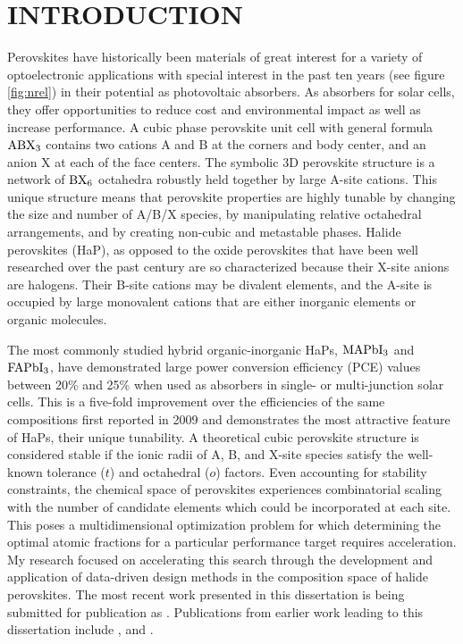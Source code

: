 \chapter{INTRODUCTION}
\label{sec:org2924b89}

Perovskites have historically been materials of great interest for a variety of optoelectronic applications with special interest in the past ten years (see figure \ref{fig:nrel}) in their potential as photovoltaic absorbers.
As absorbers for solar cells, they offer opportunities to reduce cost and environmental impact as well as increase performance.
\autocite{ansari-2018-front-oppor,yin-2015-halid-perov,manser-2016-intrig-optoel,brenner-2016-hybrid-organ}
A cubic phase perovskite unit cell with general formula \(\ce{ABX3}\) contains two cations A and B at the corners and body center, and an anion X at each of the face centers.
The symbolic 3D perovskite structure is a network of \(\ce{BX6}\) octahedra robustly held together by large A-site cations.
This unique structure means that perovskite properties are highly tunable by changing the size and number of A/B/X species, by manipulating relative octahedral arrangements, and by creating non-cubic and metastable phases.
Halide perovskites (HaP), as opposed to the oxide perovskites that have been well researched over the past century are so characterized because their X-site anions are halogens.
Their B-site cations may be divalent elements, and the A-site is occupied by large monovalent cations that are either inorganic elements or organic molecules.

The most commonly studied hybrid organic-inorganic HaPs, \(\ce{MAPbI3}\) and \(\ce{FAPbI3}\), have demonstrated large power conversion efficiency (PCE) values between 20\% and 25\% when used as absorbers in single- or multi-junction solar cells.
\autocite{cui-2019-planar-p,jeong-2020-stabl-perov}
This is a five-fold improvement over the efficiencies of the same compositions first reported in 2009 and demonstrates the most attractive feature of HaPs, their unique tunability.
A theoretical cubic perovskite structure is considered stable if the ionic radii of A, B, and X-site species satisfy the well-known tolerance (\(t\)) and octahedral (\(o\)) factors.
\autocite{bartel-2019-new-toler}
Even accounting for stability constraints, the chemical space of perovskites experiences combinatorial scaling with the number of candidate elements which could be incorporated at each site.
This poses a multidimensional optimization problem for which determining the optimal atomic fractions for a particular performance target requires acceleration.
My research focused on accelerating this search through the development and application of data-driven design methods in the composition space of halide perovskites.
The most recent work presented in this dissertation is being submitted for publication as . 
Publications from earlier work leading to this dissertation include
,
and .

